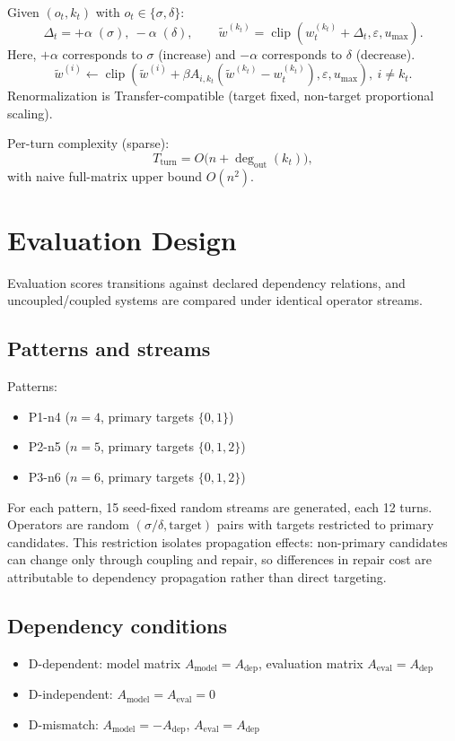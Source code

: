 \documentclass[11pt,a4paper]{article}
\begin{document}
Given \((o_t,k_t)\) with \(o_t\in\{\sigma,\delta\}\):
\[
\Delta_t = +\alpha\;(\sigma),\ -\alpha\;(\delta),\qquad
\tilde{w}^{(k_t)}=\operatorname{clip}(w_t^{(k_t)}+\Delta_t,\varepsilon,u_{\max}).
\]
Here, \(+\alpha\) corresponds to \(\sigma\) (increase) and \(-\alpha\) corresponds to \(\delta\) (decrease).
\[
\tilde{w}^{(i)} \leftarrow \operatorname{clip}(\tilde{w}^{(i)}+\beta A_{i,k_t}(\tilde{w}^{(k_t)}-w_t^{(k_t)}),\varepsilon,u_{\max}),\ i\neq k_t.
\]
Renormalization is Transfer-compatible (target fixed, non-target proportional scaling).

Per-turn complexity (sparse):
\[
T_{\text{turn}}=O\big(n+\deg_{\text{out}}(k_t)\big),
\]
with naive full-matrix upper bound \(O(n^2)\).

\section{Evaluation Design}
\label{sec:evaluation_design}
Evaluation scores transitions against declared dependency relations, and uncoupled/coupled systems are compared under identical operator streams.

\subsection{Patterns and streams}
Patterns:
\begin{itemize}
  \item P1-n4 (\(n=4\), primary targets \(\{0,1\}\))
  \item P2-n5 (\(n=5\), primary targets \(\{0,1,2\}\))
  \item P3-n6 (\(n=6\), primary targets \(\{0,1,2\}\))
\end{itemize}
For each pattern, 15 seed-fixed random streams are generated, each 12 turns.
Operators are random \((\sigma/\delta,\text{target})\) pairs with targets restricted to primary candidates.
This restriction isolates propagation effects: non-primary candidates can change only through coupling and repair, so differences in repair cost are attributable to dependency propagation rather than direct targeting.

\subsection{Dependency conditions}
\begin{itemize}
  \item D-dependent: model matrix \(A_{\text{model}}=A_{\text{dep}}\), evaluation matrix \(A_{\text{eval}}=A_{\text{dep}}\)
  \item D-independent: \(A_{\text{model}}=A_{\text{eval}}=0\)
  \item D-mismatch: \(A_{\text{model}}=-A_{\text{dep}}\), \(A_{\text{eval}}=A_{\text{dep}}\)
\end{itemize}
\end{document}
